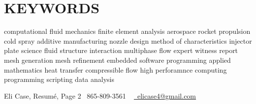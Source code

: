 \documentclass[letterpaper,11pt]{article}
\begin{document}
\section{KEYWORDS}
   \footnotesize{computational fluid mechanics finite element analysis aerospace rocket propulsion cold spray additive manufacturing nozzle design method of characteristics injector plate science fluid structure interaction multiphase flow expert witness report mesh generation mesh refinement embedded software programming applied mathematics heat transfer compressible flow high perforamnce computing programming scripting data analysis}

\vfill

Eli Case, Resum\'e, Page 2 \hfill \small \raisebox{-0.1\height}\faPhone\ 865-809-3561 ~ \hfill \href{mailto:elicase4@gmail.com}{\raisebox{-0.2\height}\faEnvelope\  \underline{elicase4@gmail.com}} ~ 
\end{document}
